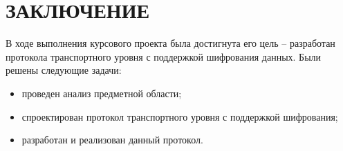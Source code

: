 \section*{ЗАКЛЮЧЕНИЕ}

В ходе выполнения курсового проекта была достигнута его цель -- разработан протокола транспортного уровня с поддержкой шифрования данных. Были решены следующие задачи:

\begin{itemize}
	\item проведен анализ предметной области;
	\item спроектирован протокол транспортного уровня с поддержкой шифрования;
	\item разработан и реализован данный протокол.
\end{itemize}

\pagebreak